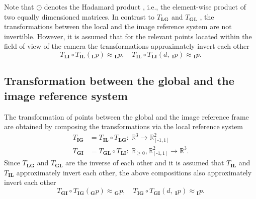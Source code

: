 Note that $\odot$ denotes the Hadamard product
, i.e., the element-wise product of two equally dimensioned matrices.
In contrast to 
$
T_\textbf{LG}
$
and 
$
T_\textbf{GL}
$
,
the transformations between the local and the image reference system
are not invertible.
However,
it is assumed that for the relevant points
located within the field of view of the camera
the transformations approximately invert each other
\begin{equation}
    T_\textbf{LI} 
    \circ 
    T_\textbf{IL} \left(
        {}_\textbf{L} p
    \right)
    \approx
    {}_\textbf{L} p
    ,\quad
    T_\textbf{IL} 
    \circ 
    T_\textbf{LI} \left(
        d
        ,\ 
        {}_\textbf{I} p
    \right)
    \approx
    {}_\textbf{I} p
    .
\end{equation}





\subsection*{Transformation between the global and the image reference system}
The transformation of points between the global and the image reference frame
are obtained by composing the transformations via the local reference system
\begin{align} \label{eq:global_image_transformations}
    T_\textbf{IG}
    &=
    T_\textbf{IL}
    \circ
    T_\textbf{LG}
    :\ 
    \mathbb{R}^3
    \rightarrow 
    \mathbb{R}_{[\text{-} 1, 1]}^2 
    \nonumber \\
    T_\textbf{GI}
    &=
    T_\textbf{GL}
    \circ
    T_\textbf{LI}
    :\ 
    \mathbb{R}_{\ge 0}
    , 
    \mathbb{R}_{[\text{-} 1, 1]}^2 
    \rightarrow 
    \mathbb{R}^3
    .
\end{align}
Since
$
T_\textbf{LG}
$
and
$
T_\textbf{GL}
$
are the inverse of each other
and it is assumed that
$
T_\textbf{IL}
$
and
$
T_\textbf{IL}
$
approximately invert each other,
the above compositions also approximately invert each other
\begin{equation}
    T_\textbf{GI} 
    \circ 
    T_\textbf{IG} \left(
        {}_\textbf{G} p
    \right)
    \approx
    {}_\textbf{G} p
    ,\quad
    T_\textbf{IG} 
    \circ 
    T_\textbf{GI} \left(
        d
        ,\
        {}_\textbf{I} p
    \right)
    \approx
    {}_\textbf{I} p
    .
\end{equation}

